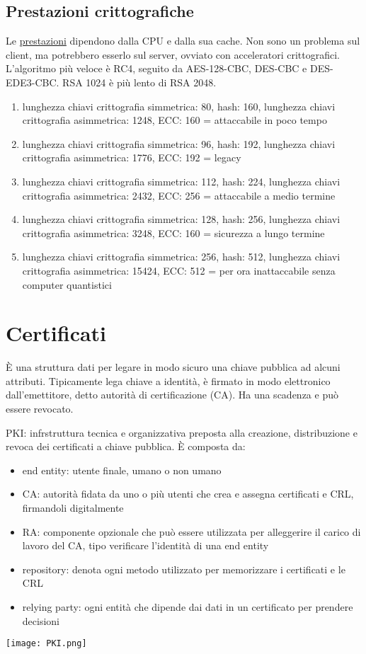 \documentclass[11pt]{article}
\begin{document}
\subsection{Prestazioni crittografiche}
Le \href{https://www.cse.wustl.edu/~jain/cse567-06/ftp/encryption_perf/}{prestazioni} dipendono dalla CPU e dalla sua cache. Non sono un problema sul client, ma potrebbero esserlo sul server,
ovviato con acceleratori crittografici.
L'algoritmo più veloce è RC4, seguito da AES-128-CBC, DES-CBC e DES-EDE3-CBC. RSA 1024 è più lento di RSA 2048.
\begin{enumerate}
    \item lunghezza chiavi crittografia simmetrica: 80, hash: 160, lunghezza chiavi crittografia asimmetrica: 1248, 
    ECC: 160 = attaccabile in poco tempo 
    \item lunghezza chiavi crittografia simmetrica: 96, hash: 192, lunghezza chiavi crittografia asimmetrica: 1776, 
    ECC: 192 = legacy
    \item lunghezza chiavi crittografia simmetrica: 112, hash: 224, lunghezza chiavi crittografia asimmetrica: 2432, 
    ECC: 256 = attaccabile a medio termine 
    \item lunghezza chiavi crittografia simmetrica: 128, hash: 256, lunghezza chiavi crittografia asimmetrica: 3248, 
    ECC: 160 = sicurezza a lungo termine
    \item lunghezza chiavi crittografia simmetrica: 256, hash: 512, lunghezza chiavi crittografia asimmetrica: 15424, 
    ECC: 512 = per ora inattaccabile senza computer quantistici
\end{enumerate}
\section{Certificati}
È una struttura dati per legare in modo sicuro una chiave pubblica ad alcuni attributi. Tipicamente lega chiave a identità,
è firmato in modo elettronico dall'emettitore, detto autorità di certificazione (CA). Ha una scadenza e può essere revocato.

PKI: infrstruttura tecnica e organizzativa preposta alla creazione, distribuzione e revoca dei certificati a chiave pubblica.
È composta da:
\begin{itemize}
    \item end entity: utente finale, umano o non umano 
    \item CA: autorità fidata da uno o più utenti che crea e assegna certificati e CRL, firmandoli digitalmente
    \item RA: componente opzionale che può essere utilizzata per alleggerire il carico di lavoro del CA, tipo verificare 
    l'identità di una end entity 
    \item repository: denota ogni metodo utilizzato per memorizzare i certificati e le CRL 
    \item relying party: ogni entità che dipende dai dati in un certificato per prendere decisioni 
\end{itemize}
\begin{center}
    \texttt{[image: PKI.png]}
\end{center}
\end{document}

